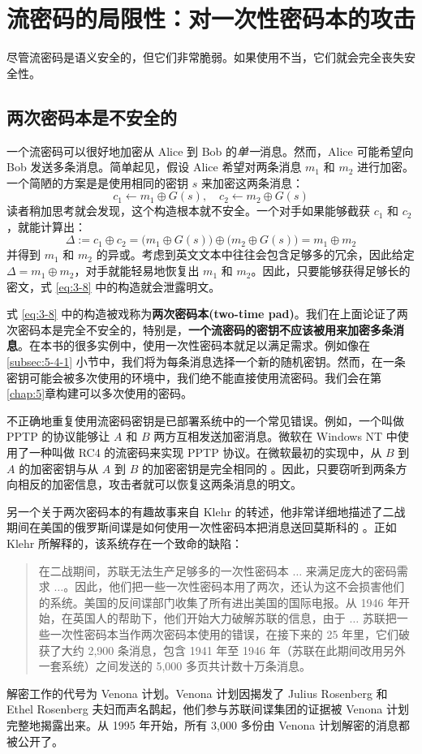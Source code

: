 \section{流密码的局限性：对一次性密码本的攻击}

尽管流密码是语义安全的，但它们非常脆弱。如果使用不当，它们就会完全丧失安全性。

\subsection{两次密码本是不安全的}

一个流密码可以很好地加密从 Alice 到 Bob 的\emph{单一}消息。然而，Alice 可能希望向 Bob 发送多条消息。简单起见，假设 Alice 希望对两条消息 $m_1$ 和 $m_2$ 进行加密。一个简陋的方案是是使用相同的密钥 $s$ 来加密这两条消息：
\begin{equation}\label{eq:3-8}
c_1\leftarrow m_1\oplus G(s),\quad
c_2\leftarrow m_2\oplus G(s)
\end{equation}
读者稍加思考就会发现，这个构造根本就不安全。一个对手如果能够截获 $c_1$ 和 $c_2$，就能计算出：
\[
\Delta
:=c_1\oplus c_2
=\big(m_1\oplus G(s)\big)\oplus\big(m_2\oplus G(s)\big)
=m_1\oplus m_2
\]
并得到 $m_1$ 和 $m_2$ 的异或。考虑到英文文本中往往会包含足够多的冗余，因此给定 $\Delta=m_1\oplus m_2$，对手就能轻易地恢复出 $m_1$ 和 $m_2$。因此，只要能够获得足够长的密文，式 \ref{eq:3-8} 中的构造就会泄露明文。

式 \ref{eq:3-8} 中的构造被戏称为\textbf{两次密码本(two-time pad)}。我们在上面论证了两次密码本是完全不安全的，特别是，\textbf{一个流密码的密钥不应该被用来加密多条消息}。在本书的很多实例中，使用一次性密码本就足以满足需求。例如像在 \ref{subsec:5-4-1} 小节中，我们将为每条消息选择一个新的随机密钥。然而，在一条密钥可能会被多次使用的环境中，我们绝不能直接使用流密码。我们会在第\ref{chap:5}章构建可以多次使用的密码。

不正确地重复使用流密码密钥是已部署系统中的一个常见错误。例如，一个叫做 PPTP 的协议能够让 $A$ 和 $B$ 两方互相发送加密消息。微软在 Windows NT 中使用了一种叫做 RC4 的流密码来实现 PPTP 协议。在微软最初的实现中，从 $B$ 到 $A$ 的加密密钥与从 $A$ 到 $B$ 的加密密钥是完全相同的 \cite{schneier1998cryptanalysis}。因此，只要窃听到两条方向相反的加密信息，攻击者就可以恢复这两条消息的明文。

另一个关于两次密码本的有趣故事来自 Klehr 的转述，他非常详细地描述了二战期间在美国的俄罗斯间谍是如何使用一次性密码本把消息送回莫斯科的 \cite{haynes1999venona}。正如 Klehr 所解释的，该系统存在一个致命的缺陷：
\begin{quote}
在二战期间，苏联无法生产足够多的一次性密码本 $\dots$ 来满足庞大的密码需求 $\dots$。因此，他们把一些一次性密码本用了两次，还认为这不会损害他们的系统。美国的反间谍部门收集了所有进出美国的国际电报。从 1946 年开始，在英国人的帮助下，他们开始大力破解苏联的信息，由于 $\dots$ 苏联把一些一次性密码本当作两次密码本使用的错误，在接下来的 25 年里，它们破获了大约 2,900 条消息，包含 1941 年至 1946 年（苏联在此期间改用另外一套系统）之间发送的 5,000 多页共计数十万条消息。
\end{quote}
解密工作的代号为 Venona 计划。Venona 计划因揭发了 Julius Rosenberg 和 Ethel Rosenberg 夫妇而声名鹊起，他们参与苏联间谍集团的证据被 Venona 计划完整地揭露出来。从 1995 年开始，所有 3,000 多份由 Venona 计划解密的消息都被公开了。

